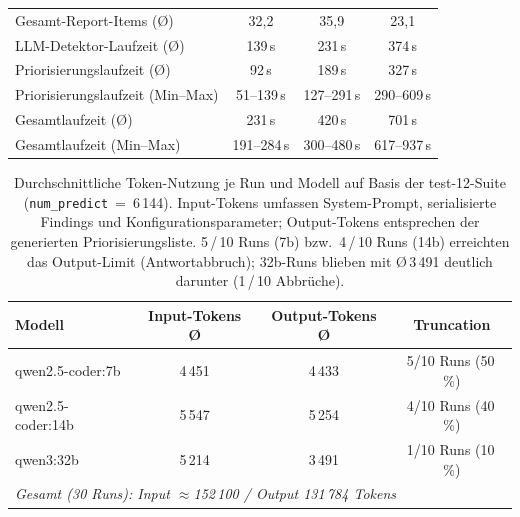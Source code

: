 \begin{table}[htbp]
{\begin{tabular}{|l|c|c|c|}
Gesamt-Report-Items (Ø)           & 32{,}2           & 35{,}9             & 23{,}1 \\
LLM-Detektor-Laufzeit (Ø)         & 139\,s           & 231\,s             & 374\,s \\
Priorisierungslaufzeit (Ø)        & 92\,s            & 189\,s             & 327\,s \\
Priorisierungslaufzeit (Min--Max) & 51--139\,s       & 127--291\,s        & 290--609\,s \\
Gesamtlaufzeit (Ø)                & 231\,s           & 420\,s             & 701\,s \\
Gesamtlaufzeit (Min--Max)         & 191--284\,s      & 300--480\,s        & 617--937\,s \\
\hline
\end{tabular}
}%
\label{tab:modell_summary_12}
\end{table}

\clearpage

\label{app:token_economy_12}

\begin{table}[htbp]
\centering
\setlength{\tabcolsep}{4pt}
\renewcommand{\arraystretch}{1.2}
\caption[Token-Nutzung pro Modell (test-12)]{Durchschnittliche Token-Nutzung je Run und Modell auf Basis der test-12-Suite (\texttt{num\_predict}~=~6\,144). Input-Tokens umfassen System-Prompt, serialisierte Findings und Konfigurationsparameter; Output-Tokens entsprechen der generierten Priorisierungsliste. 5\,/\,10 Runs (7b) bzw.\ 4\,/\,10 Runs (14b) erreichten das Output-Limit (Antwortabbruch); 32b-Runs blieben mit Ø\,3\,491 deutlich darunter (1\,/\,10 Abbrüche).}
\begin{tabular}{|l|c|c|c|}
\hline
\textbf{Modell} & \textbf{Input-Tokens Ø} & \textbf{Output-Tokens Ø} & \textbf{Truncation} \\
\hline
qwen2.5-coder:7b  & 4\,451 & 4\,433 &  5/10 Runs (50\,\%) \\
\hline
qwen2.5-coder:14b & 5\,547 & 5\,254 &  4/10 Runs (40\,\%) \\
\hline
qwen3:32b         & 5\,214 & 3\,491 &  1/10 Runs (10\,\%) \\
\hline
\multicolumn{4}{|l|}{\textit{Gesamt (30 Runs): Input $\approx$152\,100 / Output 131\,784 Tokens}} \\
\hline
\end{tabular}
\label{tab:token_economy}
\end{table}

